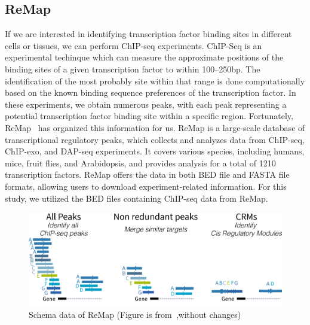 \documentclass{PHlab-thesis}
\begin{document}
\subsection{ReMap}
If we are interested in identifying transcription factor binding sites in different cells or tissues, we can perform ChIP-seq experiments. ChIP-Seq is an experimental techinque which can measure the approximate positions of the binding sites of a given transcription factor to within 100--250bp. The identification of the most probably site within that range is done computationally based on the known binding sequence preferences of the transcription factor. In these experiments, we obtain numerous peaks, with each peak representing a potential transcription factor binding site within a specific region. Fortunately, ReMap~\cite{ReMapFayrouz2022} has organized this information for us. ReMap is a large-scale database of transcriptional regulatory peaks, which collects and analyzes data from ChIP-seq, ChIP-exo, and DAP-seq experiments. It covers various species, including humans, mice, fruit flies, and Arabidopsis, and provides analysis for a total of 1210 transcription factors. ReMap offers the data in both BED file and FASTA file formats, allowing users to download experiment-related information. For this study, we utilized the BED files containing ChIP-seq data from ReMap.

\begin{figure}[H]
	\centering
	\includegraphics[scale=0.5]{figures/schema_data_remap2020_2.png}
	\caption{Schema data of ReMap (Figure is from~\cite{ReMapFayrouz2022},without changes)}
	\label{fig:remap} %
\end{figure}
\end{document}
